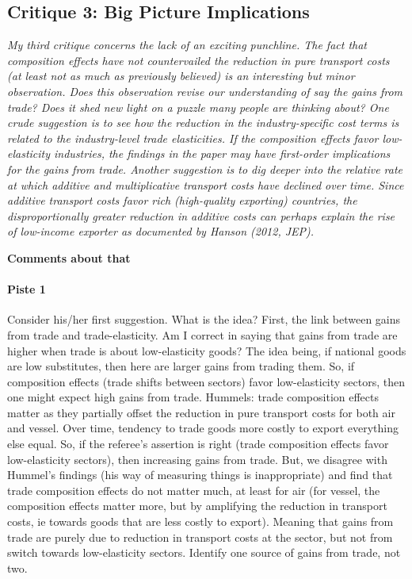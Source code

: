 \documentclass[a4paper,12pt]{article}
\begin{document}
\subsection{Critique 3: Big Picture Implications}

\textit{My third critique concerns the lack of an exciting punchline. The fact that
composition effects have not countervailed the reduction in pure transport costs
(at least not as much as previously believed) is an interesting but minor observation.
Does this observation revise our understanding of say the gains from
trade? Does it shed new light on a puzzle many people are thinking about?
One crude suggestion is to see how the reduction in the industry-specific cost
terms is related to the industry-level trade elasticities. If the composition effects
favor low-elasticity industries, the findings in the paper may have first-order
implications for the gains from trade.
Another suggestion is to dig deeper into the relative rate at which additive
and multiplicative transport costs have declined over time. Since additive transport
costs favor rich (high-quality exporting) countries, the disproportionally
greater reduction in additive costs can perhaps explain the rise of low-income
exporter as documented by Hanson (2012, JEP).}


\textbf{Comments about that}

\paragraph{Piste 1} Consider his/her first suggestion. What is the idea? First, the link between gains from trade and trade-elasticity. Am I correct in saying that gains from trade are higher when trade is about low-elasticity goods? The idea being, if national goods are low substitutes, then here are larger gains from trading them. So, if composition effects (trade shifts between sectors) favor low-elasticity sectors, then one might expect high gains from trade. Hummels: trade composition effects matter as they partially offset the reduction in pure transport costs for both air and vessel. Over time, tendency to trade goods more costly to export everything else equal. So, if the referee's assertion is right (trade composition effects favor low-elasticity sectors), then increasing gains from trade. But, we disagree with Hummel's findings (his way of measuring things is inappropriate) and find that trade composition effects do not matter much, at least for air (for vessel, the composition effects matter more, but by amplifying the reduction in transport costs, ie towards goods that are less costly to export). Meaning that gains from trade are purely due to reduction in transport costs at the sector, but not from switch towards low-elasticity sectors. Identify one source of gains from trade, not two.
\end{document}
